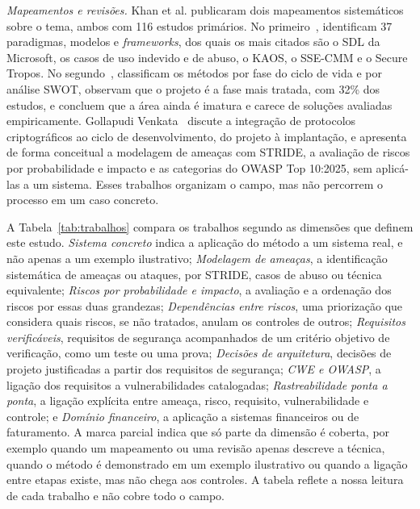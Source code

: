 \documentclass[conference]{IEEEtran}
\begin{document}
\emph{Mapeamentos e revisões.} Khan et al. publicaram dois mapeamentos sistemáticos sobre o tema, ambos com 116 estudos primários. No primeiro~\cite{khan2020}, identificam 37 paradigmas, modelos e \textit{frameworks}, dos quais os mais citados são o SDL da Microsoft, os casos de uso indevido e de abuso, o KAOS, o SSE-CMM e o Secure Tropos. No segundo~\cite{khan2021}, classificam os métodos por fase do ciclo de vida e por análise SWOT, observam que o projeto é a fase mais tratada, com 32\% dos estudos, e concluem que a área ainda é imatura e carece de soluções avaliadas empiricamente. Gollapudi Venkata~\cite{gollapudi2025} discute a integração de protocolos criptográficos ao ciclo de desenvolvimento, do projeto à implantação, e apresenta de forma conceitual a modelagem de ameaças com STRIDE, a avaliação de riscos por probabilidade e impacto e as categorias do OWASP Top 10:2025, sem aplicá-las a um sistema. Esses trabalhos organizam o campo, mas não percorrem o processo em um caso concreto.

A Tabela~\ref{tab:trabalhos} compara os trabalhos segundo as dimensões que definem este estudo. \emph{Sistema concreto} indica a aplicação do método a um sistema real, e não apenas a um exemplo ilustrativo; \emph{Modelagem de ameaças}, a identificação sistemática de ameaças ou ataques, por STRIDE, casos de abuso ou técnica equivalente; \emph{Riscos por probabilidade e impacto}, a avaliação e a ordenação dos riscos por essas duas grandezas; \emph{Dependências entre riscos}, uma priorização que considera quais riscos, se não tratados, anulam os controles de outros; \emph{Requisitos verificáveis}, requisitos de segurança acompanhados de um critério objetivo de verificação, como um teste ou uma prova; \emph{Decisões de arquitetura}, decisões de projeto justificadas a partir dos requisitos de segurança; \emph{CWE e OWASP}, a ligação dos requisitos a vulnerabilidades catalogadas; \emph{Rastreabilidade ponta a ponta}, a ligação explícita entre ameaça, risco, requisito, vulnerabilidade e controle; e \emph{Domínio financeiro}, a aplicação a sistemas financeiros ou de faturamento. A marca parcial indica que só parte da dimensão é coberta, por exemplo quando um mapeamento ou uma revisão apenas descreve a técnica, quando o método é demonstrado em um exemplo ilustrativo ou quando a ligação entre etapas existe, mas não chega aos controles. A tabela reflete a nossa leitura de cada trabalho e não cobre todo o campo.
\end{document}
